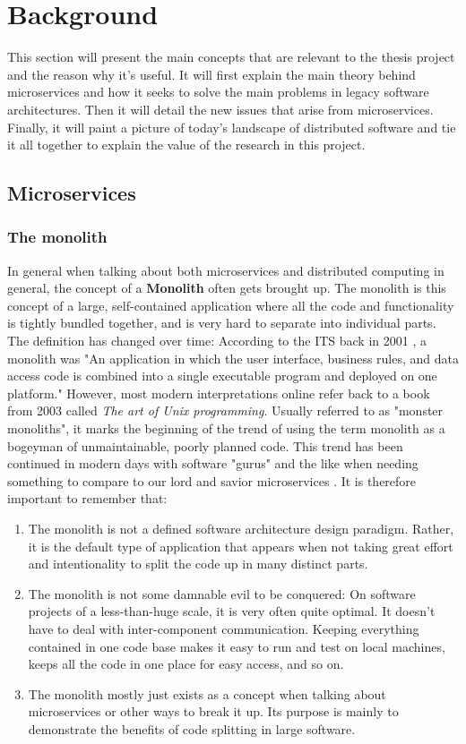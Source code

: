 \chapter{Background}

\label{Chapter2}

This section will present the main concepts that are relevant to the thesis project and the reason why it's useful.
It will first explain the main theory behind microservices and how it seeks to solve the main problems in legacy software architectures. Then it will
detail the new issues that arise from microservices. Finally, it will paint a picture of today's landscape of distributed software and 
tie it all together to explain the value of the research in this project.

\section{Microservices}
\subsection{The monolith}
In general when talking about both microservices and distributed computing in general, the concept of a \textbf{Monolith} often gets brought up. 
The monolith is this concept of a large, self-contained application where all the code and functionality is tightly bundled together, and is very hard to separate into individual parts.
The definition has changed over time: According to the ITS back in 2001 \cite{ITS}, a monolith was "An application in which the user interface, business rules, and data access code is combined into a single executable program and deployed on one platform."
However, most modern interpretations online refer back to a book from 2003 called \textit{The art of Unix programming}. Usually referred to as "monster monoliths", it marks the beginning of the trend of using the term monolith as a bogeyman of unmaintainable, poorly planned code. 
This trend has been continued in modern days with software "gurus" and the like when needing something to compare to our lord and savior microservices \cite*{Gouigoux2017}.
It is therefore important to remember that:
\begin{enumerate}
    \item The monolith is not a defined software architecture design paradigm. Rather, it is the default type of application that appears when not taking great effort and intentionality to split the code up in many distinct parts.
    \item The monolith is not some damnable evil to be conquered: On software projects of a less-than-huge scale, it is very often quite optimal. It doesn't have to deal with inter-component communication. Keeping everything contained in one code base makes it easy to run and test on local machines, keeps all the code in one place for easy access, and so on. 
    \item The monolith mostly just exists as a concept when talking about microservices or other ways to break it up. Its purpose is mainly to demonstrate the benefits of code splitting in large software.
\end{enumerate}

